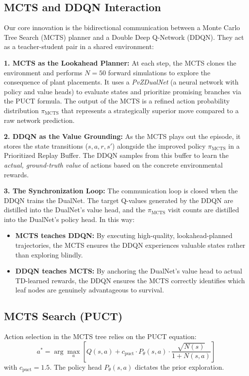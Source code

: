 \documentclass[conference]{IEEEtran}
\begin{document}
\subsection{MCTS and DDQN Interaction}
Our core innovation is the bidirectional communication between a Monte Carlo Tree Search (MCTS) planner and a Double Deep Q-Network (DDQN). They act as a teacher-student pair in a shared environment:

\textbf{1. MCTS as the Lookahead Planner:}
At each step, the MCTS clones the environment and performs $N=50$ forward simulations to explore the consequence of plant placements. It uses a \textit{PvZDualNet} (a neural network with policy and value heads) to evaluate states and prioritize promising branches via the PUCT formula. The output of the MCTS is a refined action probability distribution $\pi_{\text{MCTS}}$ that represents a strategically superior move compared to a raw network prediction.

\textbf{2. DDQN as the Value Grounding:}
As the MCTS plays out the episode, it stores the state transitions ($s, a, r, s'$) alongside the improved policy $\pi_{\text{MCTS}}$ in a Prioritized Replay Buffer. The DDQN samples from this buffer to learn the \textit{actual, ground-truth value} of actions based on the concrete environmental rewards. 

\textbf{3. The Synchronization Loop:}
The communication loop is closed when the DDQN trains the DualNet. The target Q-values generated by the DDQN are distilled into the DualNet's value head, and the $\pi_{\text{MCTS}}$ visit counts are distilled into the DualNet's policy head. In this way:
\begin{itemize}[leftmargin=*,nosep]
    \item \textbf{MCTS teaches DDQN:} By executing high-quality, lookahead-planned trajectories, the MCTS ensures the DDQN experiences valuable states rather than exploring blindly.
    \item \textbf{DDQN teaches MCTS:} By anchoring the DualNet's value head to actual TD-learned rewards, the DDQN ensures the MCTS correctly identifies which leaf nodes are genuinely advantageous to survival.
\end{itemize}

\subsection{MCTS Search (PUCT)}
Action selection in the MCTS tree relies on the PUCT equation:
\begin{equation}
a^* = \arg\max_a \left[ Q(s,a) + c_{\text{puct}} \cdot P_\theta(s,a) \cdot \frac{\sqrt{N(s)}}{1 + N(s,a)} \right]
\end{equation}
with $c_{\text{puct}}{=}1.5$. The policy head $P_\theta(s,a)$ dictates the prior exploration.
\end{document}
